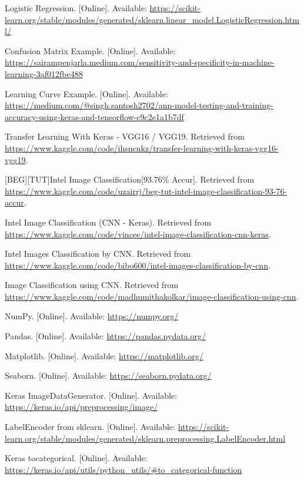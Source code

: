 \documentclass[conference]{IEEEtran}
\begin{document}
\begin{thebibliography}{10}
Logistic Regression. [Online]. Available: \url{https://scikit-learn.org/stable/modules/generated/sklearn.linear_model.LogisticRegression.html/}

Confusion Matrix Example. [Online]. Available: \url{https://sairampenjarla.medium.com/sensitivity-and-specificity-in-machine-learning-3af012fbe488}

Learning Curve Example. [Online]. Available: \url{https://medium.com/@singh.santosh2702/ann-model-testing-and-training-accuracy-using-keras-and-tensorflow-c9c2e1a1b7df}

Transfer Learning With Keras - VGG16 / VGG19. 
Retrieved from \url{https://www.kaggle.com/code/ihsncnkz/transfer-learning-with-keras-vgg16-vgg19}.

[BEG][TUT]Intel Image Classification[93.76\% Accur]. 
Retrieved from \url{https://www.kaggle.com/code/uzairrj/beg-tut-intel-image-classification-93-76-accur}.

Intel Image Classification (CNN - Keras). 
Retrieved from \url{https://www.kaggle.com/code/vincee/intel-image-classification-cnn-keras}.

Intel Images Classification by CNN. 
Retrieved from \url{https://www.kaggle.com/code/bibo600/intel-images-classification-by-cnn}.

Image Classification using CNN. 
Retrieved from \url{https://www.kaggle.com/code/madhumithakolkar/image-classification-using-cnn}.

NumPy. [Online]. Available: \url{https://numpy.org/}

Pandas. [Online]. Available: \url{https://pandas.pydata.org/}

Matplotlib. [Online]. Available: \url{https://matplotlib.org/}

Seaborn. [Online]. Available: \url{https://seaborn.pydata.org/}

Keras ImageDataGenerator. [Online]. Available: \url{https://keras.io/api/preprocessing/image/}

LabelEncoder from sklearn. [Online]. Available: \url{https://scikit-learn.org/stable/modules/generated/sklearn.preprocessing.LabelEncoder.html}

Keras tocategorical. [Online]. Available: \url{https://keras.io/api/utils/python_utils/#to_categorical-function}


\end{thebibliography}
\end{document}
